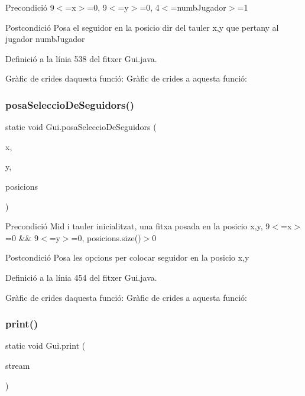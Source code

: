 \begin{DoxyPrecond}{Precondició}
9$<$=x$>$=0, 9$<$=y$>$=0, 4$<$=numb\+Jugador$>$=1 
\end{DoxyPrecond}
\begin{DoxyPostcond}{Postcondició}
Posa el seguidor en la posicio dir del tauler x,y que pertany al jugador numb\+Jugador 
\end{DoxyPostcond}


Definició a la línia 538 del fitxer Gui.\+java.

Gràfic de crides d\textquotesingle{}aquesta funció\+:
Gràfic de crides a aquesta funció\+:
\mbox{\label{class_gui_a34f713e45c926f57aad018e533da18cb}} 
\subsubsection{\texorpdfstring{posa\+Seleccio\+De\+Seguidors()}{posaSeleccioDeSeguidors()}}
{\footnotesize\ttfamily static void Gui.\+posa\+Seleccio\+De\+Seguidors (\begin{DoxyParamCaption}\item[{int}]{x,  }\item[{int}]{y,  }\item[{Array\+List$<$ Character $>$}]{posicions }\end{DoxyParamCaption})\hspace{0.3cm}{\ttfamily [static]}}

\begin{DoxyPrecond}{Precondició}
Mid i tauler inicialitzat, una fitxa posada en la posicio x,y, 9$<$=x$>$=0 \&\& 9$<$=y$>$=0, posicions.\+size()$>$0 
\end{DoxyPrecond}
\begin{DoxyPostcond}{Postcondició}
Posa les opcions per colocar seguidor en la posicio x,y 
\end{DoxyPostcond}


Definició a la línia 454 del fitxer Gui.\+java.

Gràfic de crides d\textquotesingle{}aquesta funció\+:
Gràfic de crides a aquesta funció\+:
\mbox{\label{class_gui_a536efde44f03608985f04155cfb829e4}} 
\subsubsection{\texorpdfstring{print()}{print()}}
{\footnotesize\ttfamily static void Gui.\+print (\begin{DoxyParamCaption}\item[{String}]{stream }\end{DoxyParamCaption})\hspace{0.3cm}{\ttfamily [static]}}


